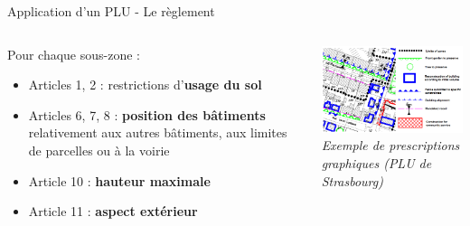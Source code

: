 \documentclass[xcolor=table]{beamer}
\begin{document}
\begin{frame}{Application d'un PLU - Le règlement}
\begin{columns}[T]
\begin{column}[T]{5cm}
Pour chaque sous-zone : 
\begin{itemize}
\item Articles 1, 2 : restrictions d’\textbf{usage du sol}
\item Articles 6, 7, 8 : \textbf{position des bâtiments} relativement aux autres bâtiments, aux limites de parcelles ou à la voirie
\item Article 10 : \textbf{hauteur maximale}
\item Article 11 : \textbf{aspect extérieur}
\end{itemize}
\end{column}
\begin{column}[T]{5.5cm}
\centering
\includegraphics[width=6cm]{Images/codesplu.png}
\\
\textit{Exemple de prescriptions graphiques (PLU de Strasbourg)}
\end{column}
\end{columns}
\end{frame}
\end{document}

